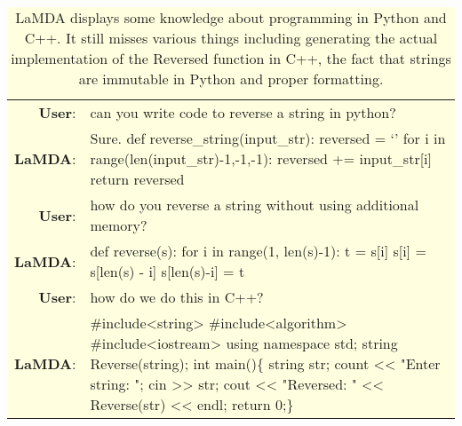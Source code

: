 \documentclass{article}
\begin{document}
\begin{table}[ht!]
\small
\centering
\colorbox{lightyellow}{

\begin{tabular}{rp{12cm}}
\textbf{User}: & can you write code to reverse a string in python? \\
\textbf{LaMDA}: & Sure. def reverse\_string(input\_str): reversed = `' for i in range(len(input\_str)-1,-1,-1): reversed += input\_str[i] return reversed \\
\textbf{User}: & how do you reverse a string without using additional memory? \\
\textbf{LaMDA}: & def reverse(s): for i in range(1, len(s)-1): t = s[i] s[i] = s[len(s) - i] s[len(s)-i] = t \\
\textbf{User}: & how do we do this in C++?\\
\textbf{LaMDA}: & \#include<string> \#include<algorithm> \#include<iostream> using namespace std; string Reverse(string); int main()\{ string str; count << "Enter string: "; cin >> str; cout << "Reversed: " << Reverse(str) << endl; return 0;\}\\
\end{tabular}
}
\caption{LaMDA displays some knowledge about programming in Python and C++. It still misses various things including generating the actual implementation of the Reversed function in C++, the fact that strings are immutable in Python and proper formatting.}
\label{tab:example-conv6b}
\end{table}
\end{document}
